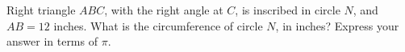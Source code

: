 Right triangle $ABC$, with the right angle at $C$, is inscribed in circle $N$, and $AB=12$ inches. What is the circumference of circle $N$, in inches? Express your answer in terms of $\pi$.
